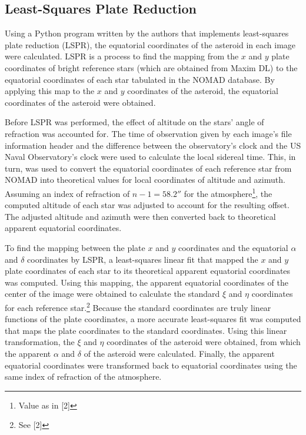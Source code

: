 \documentclass[12pt,journal,compsoc]{IEEEtran}
\begin{document}
\subsection{Least-Squares Plate Reduction}
Using a Python program written by the authors that implements least-squares plate reduction (LSPR), 
the equatorial coordinates of the asteroid in each image were calculated.
LSPR is a process to find the mapping from the $x$ and $y$ plate coordinates of bright reference stars 
(which are obtained from Maxim DL) to the equatorial coordinates
of each star tabulated in the NOMAD database.
By applying this map to the $x$ and $y$ coordinates of the asteroid, the equatorial coordinates of
the asteroid were obtained.

Before LSPR was performed, the effect of altitude on the stars' angle of refraction was accounted for.
The time of observation given by each image's file information header and the difference between the 
observatory's clock and the US Naval Observatory's clock were used to calculate the local sidereal time.
This, in turn, was used to convert the equatorial coordinates of each reference star from NOMAD 
into theoretical values for local coordinates of altitude and azimuth.
Assuming an index of refraction of $n-1=58.2''$ for the atmosphere\footnote{Value as in [2]}, 
the computed altitude of each star was adjusted to account for the resulting offset.
The adjusted altitude and azimuth were then converted back to theoretical apparent equatorial coordinates.

To find the mapping between the plate $x$ and $y$ coordinates and the equatorial $\alpha$ and $\delta$ coordinates by LSPR, 
a least-squares linear fit that mapped the $x$ and $y$ plate coordinates of each star to its 
theoretical apparent equatorial coordinates was computed.
Using this mapping, the apparent equatorial coordinates of the center of the image were obtained 
to calculate the standard $\xi$ and $\eta$ coordinates for each reference star.\footnote{See [2]} 
Because the standard coordinates are truly linear functions of the plate coordinates, 
a more accurate least-squares fit was computed that maps the plate coordinates to the standard coordinates.
Using this linear transformation, the $\xi$ and $\eta$ coordinates of the asteroid were obtained, 
from which the apparent $\alpha$ and $\delta$ of the asteroid were calculated.
Finally, the apparent equatorial coordinates were transformed back to equatorial coordinates 
using the same index of refraction of the atmosphere.
\end{document}
